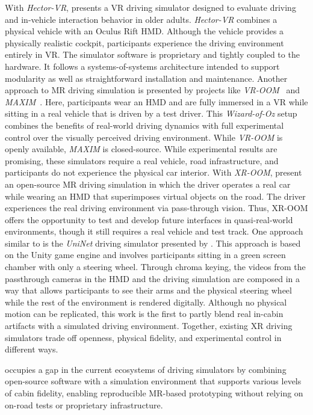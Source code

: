 \documentclass[sigconf, screen]{acmart}
\begin{document}
With \textit{Hector-VR}, \citet{mortimer_hector-vr_2019} presents a \gls{VR} driving simulator designed to evaluate driving and in-vehicle interaction behavior in older adults. \textit{Hector-VR} combines a physical vehicle with an Oculus Rift \gls{HMD}. Although the vehicle provides a physically realistic cockpit, participants experience the driving environment entirely in \gls{VR}. The simulator software is proprietary and tightly coupled to the hardware. It follows a systems-of-systems architecture intended to support modularity as well as straightforward installation and maintenance.
Another approach to \gls{MR} driving simulation is presented by projects like \textit{VR-OOM}~\cite{goedicke_vr-oom_2018} and \textit{MAXIM}~\cite{yeo_maxim_2019}. Here, participants wear an \gls{HMD} and are fully immersed in a \gls{VR} while sitting in a real vehicle that is driven by a test driver. This \textit{Wizard-of-Oz} setup combines the benefits of real-world driving dynamics with full experimental control over the visually perceived driving environment. While \textit{VR-OOM} is openly available, \textit{MAXIM} is closed-source. While experimental results are promising, these simulators require a real vehicle, road infrastructure, and participants do not experience the physical car interior. 
%
With \textit{XR-OOM}, \citet{goedicke_xr-oom_2022} present an open-source MR driving simulation in which the driver operates a real car while wearing an \gls{HMD} that superimposes virtual objects on the road. The driver experiences the real driving environment via pass-through vision. Thus, XR-OOM offers the opportunity to test and develop future interfaces in quasi-real-world environments, though it still requires a real vehicle and test track.
%
One approach similar to \name is the \textit{UniNet} driving simulator presented by \citet{arppe_uninet_2020}. This approach is based on the Unity game engine and involves participants sitting in a green screen chamber with only a steering wheel. Through chroma keying, the videos from the passthrough cameras in the HMD and the driving simulation are composed in a way that allows participants to see their arms and the physical steering wheel while the rest of the environment is rendered digitally. Although no physical motion can be replicated, this work is the first to partly blend real in-cabin artifacts with a simulated driving environment.
%
Together, existing XR driving simulators trade off openness, physical fidelity, and experimental control in different ways.

\name occupies a gap in the current ecosystems of driving simulators by combining open-source software with a simulation environment that supports various levels of cabin fidelity, enabling reproducible \gls{MR}-based prototyping without relying on on-road tests or proprietary infrastructure.
\end{document}
